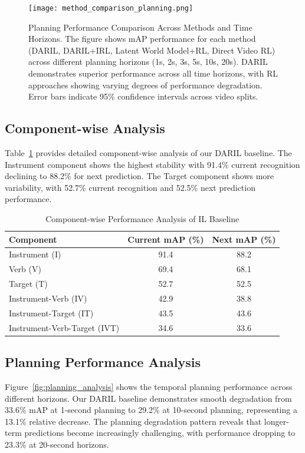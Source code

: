 \documentclass[runningheads]{llncs}
\begin{document}
\begin{figure}[h]
\centering
\texttt{[image: method\_comparison\_planning.png]}
\caption{Planning Performance Comparison Across Methods and Time Horizons. The figure shows mAP performance for each method (DARIL, DARIL+IRL, Latent World Model+RL, Direct Video RL) across different planning horizons (1s, 2s, 3s, 5s, 10s, 20s). DARIL demonstrates superior performance across all time horizons, with RL approaches showing varying degrees of performance degradation. Error bars indicate 95\% confidence intervals across video splits.}
\label{fig:method_comparison}
\end{figure}

\subsection{Component-wise Analysis}

Table~\ref{tab:component_analysis} provides detailed component-wise analysis of our DARIL baseline. The Instrument component shows the highest stability with 91.4\% current recognition declining to 88.2\% for next prediction. The Target component shows more variability, with 52.7\% current recognition and 52.5\% next prediction performance.

\begin{table}[h]
\centering
\caption{Component-wise Performance Analysis of IL Baseline}
\label{tab:component_analysis}
\begin{tabular}{lcc}
\toprule
\textbf{Component} & \textbf{Current mAP (\%)} & \textbf{Next mAP (\%)} \\
\midrule
Instrument (I) & 91.4 & 88.2 \\
Verb (V) & 69.4 & 68.1 \\
Target (T) & 52.7 & 52.5 \\
\midrule
Instrument-Verb (IV) & 42.9 & 38.8 \\
Instrument-Target (IT) & 43.5 & 43.6 \\
Instrument-Verb-Target (IVT) & 34.6 & 33.6 \\
\bottomrule
\end{tabular}
\end{table}

\subsection{Planning Performance Analysis}

Figure~\ref{fig:planning_analysis} shows the temporal planning performance across different horizons. Our DARIL baseline demonstrates smooth degradation from 33.6\% mAP at 1-second planning to 29.2\% at 10-second planning, representing a 13.1\% relative decrease. The planning degradation pattern reveals that longer-term predictions become increasingly challenging, with performance dropping to 23.3\% at 20-second horizons.
\end{document}
